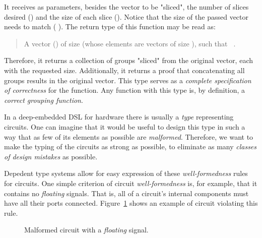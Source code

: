     \begin{center}
    \end{center}

    It receives as parameters, besides the vector to be "sliced",
    the number of slices desired () and the size of each slice ().
    Notice that the size of the passed vector needs to match ( \AF{*} ).
    The return type of this function may be read as:

    \begin{quote}
        A vector () of size  (whose elements are vectors of size ),
        such that \texttt{   }.
    \end{quote}

    Therefore, it returns a collection of groups "sliced" from the original vector, each with the requested size.
    Additionally, it returns a proof that concatenating all groups results in the original vector.
    This type serves as a \emph{complete specification of correctness} for the function.
    Any function with this type is, by definition, a \emph{correct grouping function}.

    In a deep-embedded \acs{DSL} for hardware there is usually a \emph{type} representing circuits.
    One can imagine that it would be useful to design this type
    in such a way that as few of its elements as possible are \emph{malformed}.
    Therefore, we want to make the typing of the circuits as strong as possible,
    to eliminate as many \emph{classes of design mistakes} as possible.

    Depedent type systems allow for easy expression of these \emph{well-formedness} rules for circuits.
    One simple criterion of circuit \emph{well-formedness} is, for example, that it contains no \emph{floating} signals.
    That is, all of a circuit's internal components must have all their ports connected.
    Figure~\ref{fig:floating-wire} shows an example of circuit violating this rule.

    \begin{figure}[h]
        \caption{Malformed circuit with a \emph{floating} signal. \label{fig:floating-wire}}
    \end{figure}

